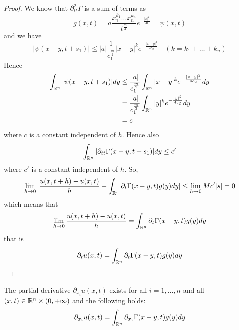 \begin{ProofBox}
\begin{proof}
        We know that $\partial^2_{tt}\Gamma$ is a sum of terms as 
        \begin{equation*}
            g(x,t) = a \frac{x_1^{k_1}\ldots x_n^{k_n}}{t^\frac{m}{2}} e^{-\frac{|x|^2}{4t}} = \psi(x,t)
        \end{equation*}
        and we have
        \begin{equation*}
            |\psi(x-y,t+s_1)| \leq |a| \frac{1}{c_1^\frac{m}{2}}|x-y|^k e^{-\frac{|x-y|^2}{4c_2}} \quad (k=k_1 + \ldots + k_n)
        \end{equation*}
        Hence
        \begin{align*}
            \int_{\mathbb{R}^n} |\psi(x-y,t+s_1)| dy &\leq \frac{|a|}{c_1^\frac{m}{2}} \int_{\mathbb{R}^n} |x-y|^k e^{-\frac{|x-y|^2}{4c_2}}dy \\
            &= \frac{|a|}{c_1^\frac{m}{2}} \int_{\mathbb{R}^n} |y|^k e^{-\frac{|y|^2}{4c_2}} dy \\
            &= c
        \end{align*}
        where $c$ is a constant independent of $h$. Hence also
        \begin{equation*}
            \int_{\mathbb{R}^n} |\partial_{tt} \Gamma(x-y,t+s_1)| dy \leq c'
        \end{equation*}
        where $c'$ is a constant independent of $h$. So,
        \begin{equation*}
            \lim_{h \rightarrow 0} |\frac{u(x,t+h) - u(x,t)}{h}-\int_{\mathbb{R}^n} \partial_t \Gamma(x-y,t) g(y)dy| \leq \lim_{h \rightarrow 0} M c'|s| = 0
        \end{equation*}
        which means that 
        \begin{equation*}
            \lim_{h \rightarrow 0} \frac{u(x,t+h) - u(x,t)}{h} = \int_{\mathbb{R}^n} \partial_t \Gamma(x-y,t) g(y)dy
        \end{equation*}
        that is 
        \begin{equation*}
            \partial_t u(x,t) = \int_{\mathbb{R}^n} \partial_t \Gamma(x-y,t) g(y) dy
        \end{equation*}
    \end{proof}
\end{ProofBox}
\begin{PropBox}
    \begin{Lemma}[Lemma 3]
    \label{Lemma 3}
        The partial derivative $\partial_{x_i} u(x,t)$ exists for all $i = 1, \ldots, n$ and all $(x,t) \in \mathbb{R}^n \times (0,+\infty)$ and the following holds:
        \begin{equation*}
            \partial_{x_i} u(x,t) = \int_{\mathbb{R}^n} \partial_{x_i} \Gamma(x-y,t) g(y) dy
        \end{equation*}
    \end{Lemma}
\end{PropBox}
